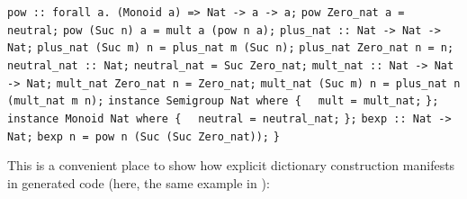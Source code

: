 \begin{isabellebody}
\begin{isamarkuptext}
\newline%
\verb|pow :: forall a. (Monoid a) => Nat -> a -> a;|\newline%
\verb|pow Zero_nat a = neutral;|\newline%
\verb|pow (Suc n) a = mult a (pow n a);|\newline%
\newline%
\verb|plus_nat :: Nat -> Nat -> Nat;|\newline%
\verb|plus_nat (Suc m) n = plus_nat m (Suc n);|\newline%
\verb|plus_nat Zero_nat n = n;|\newline%
\newline%
\verb|neutral_nat :: Nat;|\newline%
\verb|neutral_nat = Suc Zero_nat;|\newline%
\newline%
\verb|mult_nat :: Nat -> Nat -> Nat;|\newline%
\verb|mult_nat Zero_nat n = Zero_nat;|\newline%
\verb|mult_nat (Suc m) n = plus_nat n (mult_nat m n);|\newline%
\newline%
\verb|instance Semigroup Nat where {|\newline%
\verb|  mult = mult_nat;|\newline%
\verb|};|\newline%
\newline%
\verb|instance Monoid Nat where {|\newline%
\verb|  neutral = neutral_nat;|\newline%
\verb|};|\newline%
\newline%
\verb|bexp :: Nat -> Nat;|\newline%
\verb|bexp n = pow n (Suc (Suc Zero_nat));|\newline%
\newline%
\verb|}|%
\end{isamarkuptext}%
\isamarkuptrue%
%
\endisatagquoteme
{\isafoldquoteme}%
%
\isadelimquoteme
%
\endisadelimquoteme
%
\begin{isamarkuptext}%
\noindent This is a convenient place to show how explicit dictionary construction
  manifests in generated code (here, the same example in ):%
\end{isamarkuptext}%
\isamarkuptrue%
%
\isadelimquoteme
%
\endisadelimquoteme
%
\isatagquoteme
%
\begin{isamarkuptext}%
\isaverbatim%
\noindent%

\end{isamarkuptext}
\end{isabellebody}
